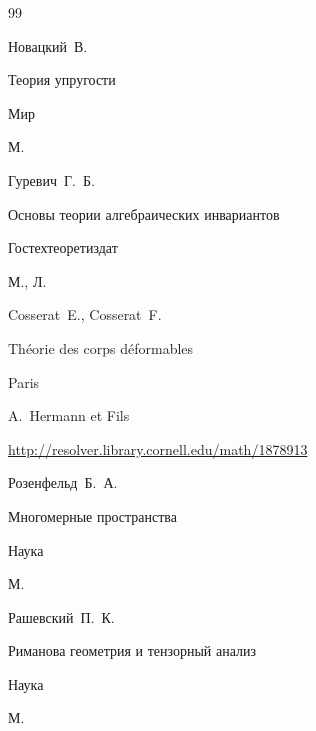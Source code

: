 \begin{thebibliography}{99}
\morerref

\by Новацкий~В.

\book Теория упругости


\publ Мир

\publaddr М.











\by Гуревич~Г.~Б.

\book Основы теории алгебраических инвариантов


\publ Гостехтеоретиздат

\publaddr М., Л.





\by Cosserat~E., Cosserat~F.

\book Th\'eorie des corps d\'eformables

\publaddr Paris

\publ A.~Hermann et Fils


\elink \url{http://resolver.library.cornell.edu/math/1878913}





\by Розенфельд~Б.~А.

\book  Многомерные пространства


\publ Наука

\publaddr М.





\by Рашевский~П.~К.

\book Риманова геометрия и тензорный анализ


\publ Наука

\publaddr М.






\end{thebibliography}
